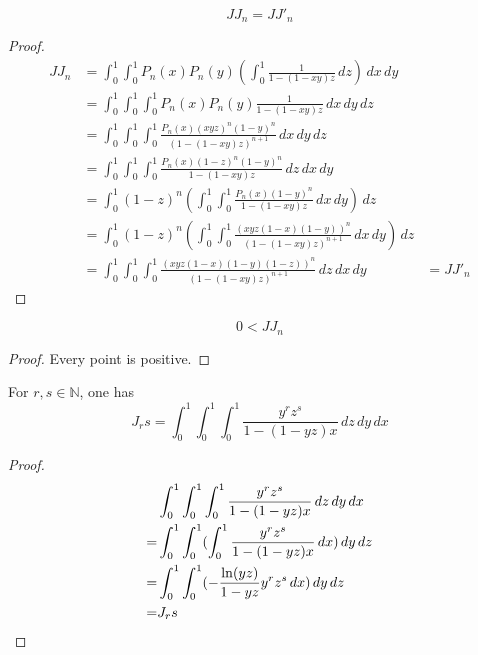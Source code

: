 \begin{theorem}\label{JJ_eq_form}
    \[ JJ_n = JJ'_n \]
\end{theorem}
\begin{proof}
    \leanok
    \begin{align*}
        JJ_n &= \int_{0}^{1}\int_{0}^{1} P_n(x)P_n(y)(\int_{0}^{1} \frac{1}{1 - (1 - xy)z} \, dz) \, dx \, dy \\
        &=\int_{0}^{1}\int_{0}^{1}\int_{0}^{1} P_n(x)P_n(y) \frac{1}{1 - (1 - xy)z} \, dx \, dy \, dz \\
        &=\int_{0}^{1}\int_{0}^{1}\int_{0}^{1} \frac{P_n(x)(xyz)^n(1-y)^n}{(1-(1-xy)z)^{n + 1}} \, dx \, dy \, dz \\
        &=\int_{0}^{1}\int_{0}^{1}\int_{0}^{1} \frac{P_n(x)(1-z)^n(1-y)^n}{1-(1-xy)z}  \, dz \, dx \, dy  \\
        &=\int_{0}^{1} (1-z)^n (\int_{0}^{1}\int_{0}^{1} \frac{P_n(x)(1-y)^n}{1-(1-xy)z}  \, dx \, dy) \, dz \\
        &=\int_{0}^{1} (1-z)^n (\int_{0}^{1}\int_{0}^{1} \frac{(xyz(1-x)(1-y))^n}{(1-(1-xy)z)^{n+1}} \, dx \, dy) \, dz \\
        &=\int_{0}^{1}\int_{0}^{1}\int_{0}^{1} \frac{(xyz(1-x)(1-y)(1-z))^n}{(1-(1-xy)z)^{n+1}} \, dz \, dx \, dy
        &=JJ'_n
    \end{align*}
\end{proof}

\begin{theorem}\label{JJ_pos}
    \[ 0 < JJ_n \]
\end{theorem}
\begin{proof}
    \leanok
    Every point is positive.
\end{proof}


\begin{lemma}\label{J_eq_triple}
    For $r, s \in \mathbb{N}$, one has
    \[ J_rs = \int_{0}^{1}\int_{0}^{1}\int_{0}^{1} \frac{y^rz^s}{1-(1-yz)x} \, dz \, dy \, dx \]
\end{lemma}
\begin{proof}
    \leanok
    \begin{align*}
        &\int_{0}^{1}\int_{0}^{1}\int_{0}^{1} \frac{y^rz^s}{1-(1-yz)x} \, dz \, dy \, dx \\
        =& \int_{0}^{1}\int_{0}^{1}(\int_{0}^{1} \frac{y^rz^s}{1-(1-yz)x} \, dx) \, dy \, dz \\
        =& \int_{0}^{1}\int_{0}^{1}(-\frac{{\rm ln}(yz)}{1 - yz}y^rz^s \, dx) \, dy \, dz \\
        =& J_rs
    \end{align*}
\end{proof}


